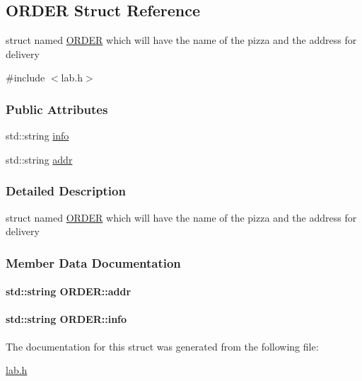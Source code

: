 \hypertarget{structORDER}{\subsection{O\+R\+D\+E\+R Struct Reference}
\label{structORDER}
}


struct named \hyperlink{structORDER}{O\+R\+D\+E\+R} which will have the name of the pizza and the address for delivery  




{\ttfamily \#include $<$lab.\+h$>$}

\subsubsection*{Public Attributes}
\begin{DoxyCompactItemize}
\item 
std\+::string \hyperlink{structORDER_aea87cd05ef2f7d3f6b2c5b9eebd0199d}{info}
\item 
std\+::string \hyperlink{structORDER_a501ab180a46b15c372b77037ef5b3edc}{addr}
\end{DoxyCompactItemize}


\subsubsection{Detailed Description}
struct named \hyperlink{structORDER}{O\+R\+D\+E\+R} which will have the name of the pizza and the address for delivery 

\subsubsection{Member Data Documentation}
\hypertarget{structORDER_a501ab180a46b15c372b77037ef5b3edc}{
\paragraph[{addr}]{\setlength{\rightskip}{0pt plus 5cm}std\+::string O\+R\+D\+E\+R\+::addr}}\label{structORDER_a501ab180a46b15c372b77037ef5b3edc}
\hypertarget{structORDER_aea87cd05ef2f7d3f6b2c5b9eebd0199d}{
\paragraph[{info}]{\setlength{\rightskip}{0pt plus 5cm}std\+::string O\+R\+D\+E\+R\+::info}}\label{structORDER_aea87cd05ef2f7d3f6b2c5b9eebd0199d}


The documentation for this struct was generated from the following file\+:\begin{DoxyCompactItemize}
\item 
\hyperlink{lab_8h}{lab.\+h}\end{DoxyCompactItemize}
